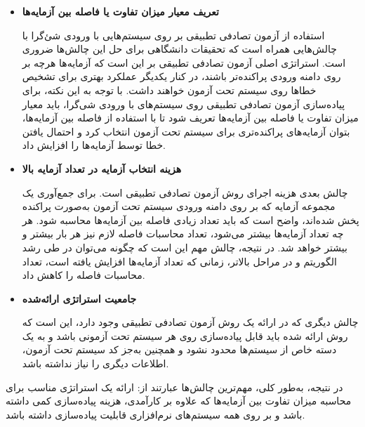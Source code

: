 \begin{itemize}
	\item \textbf{تعریف معیار میزان تفاوت یا فاصله بین آزمایه‌ها}
	
	استفاده از آزمون تصادفی تطبیقی بر روی سیستم‌هایی با ورودی شئ‌گرا با چالش‌هایی همراه است که تحقیقات دانشگاهی برای حل این چالش‌ها ضروری است. استراتژی اصلی آزمون تصادفی تطبیقی بر این است که آزمایه‌ها هرچه بر روی دامنه ورودی پراکنده‌تر باشند، در کنار یکدیگر عملکرد بهتری برای تشخیص خطاها روی سیستم تحت آزمون خواهند داشت. با توجه به این نکته، برای پیاده‌سازی آزمون تصادفی تطبیقی روی سیستم‌های با ورودی شی‌گرا، باید معیار میزان تفاوت یا فاصله بین آزمایه‌ها تعریف شود تا با استفاده از فاصله بین آزمایه‌ها، بتوان آزمایه‌های پراکنده‌تری برای سیستم تحت آزمون انتخاب کرد و احتمال یافتن خطا توسط آزمایه‌ها را افزایش داد.
	
	\item \textbf{هزینه انتخاب آزمایه در تعداد آزمایه بالا}
	
چالش بعدی هزینه اجرای روش آزمون تصادفی تطبیقی است. برای جمع‌آوری یک مجموعه آزمایه که بر روی دامنه ورودی سیستم تحت آزمون به‌صورت پراکنده پخش شده‌اند، واضح است که باید تعداد زیادی فاصله بین آزمایه‌ها محاسبه شود. هر چه تعداد آزمایه‌ها بیشتر می‌شود، تعداد محاسبات فاصله لازم نیز هر بار بیشتر و بیشتر خواهد شد. در نتیجه، چالش مهم این است که چگونه می‌توان در طی رشد الگوریتم و در مراحل بالاتر، زمانی که تعداد آزمایه‌ها افزایش یافته است، تعداد محاسبات فاصله را کاهش داد.
	
	\item \textbf{جامعیت استراتژی ارائه‌شده}
	
چالش دیگری که در ارائه یک روش آزمون تصادفی تطبیقی وجود دارد، این است که روش ارائه شده باید قابل پیاده‌سازی روی هر سیستم تحت آزمونی باشد و به یک دسته خاص از سیستم‌ها محدود نشود و همچنین به‌جز کد سیستم تحت آزمون، اطلاعات دیگری را نیاز نداشته باشد.
	
\end{itemize}

در نتیجه، به‌طور کلی، مهم‌ترین چالش‌ها عبارتند از: ارائه یک استراتژی مناسب برای محاسبه میزان تفاوت بین آزمایه‌ها که علاوه بر کارآمدی، هزینه پیاده‌سازی کمی داشته باشد و بر روی همه سیستم‌های نرم‌افزاری قابلیت پیاده‌سازی داشته باشد.

